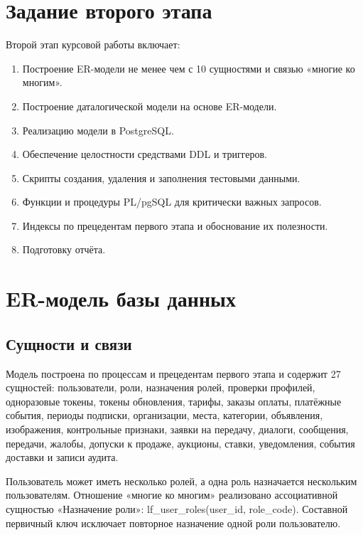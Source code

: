 \clearpage
\section*{Задание второго этапа}
{}

Второй этап курсовой работы включает:

\begin{enumerate}
\item Построение ER-модели не менее чем с 10 сущностями и связью «многие ко многим».
\item Построение даталогической модели на основе ER-модели.
\item Реализацию модели в Postgre\allowbreak{}SQL.
\item Обеспечение целостности средствами DDL и триггеров.
\item Скрипты создания, удаления и заполнения тестовыми данными.
\item Функции и процедуры PL/\allowbreak{}pg\allowbreak{}SQL для критически важных запросов.
\item Индексы по прецедентам первого этапа и обоснование их полезности.
\item Подготовку отчёта.
\end{enumerate}

\clearpage
\section{ER-модель базы данных}

\FloatBarrier
{}
\subsection{Сущности и связи}

Модель построена по процессам и прецедентам первого этапа и содержит 27 сущностей: пользователи, роли, назначения ролей, проверки профилей, одноразовые токены, токены обновления, тарифы, заказы оплаты, платёжные события, периоды подписки, организации, места, категории, объявления, изображения, контрольные признаки, заявки на передачу, диалоги, сообщения, передачи, жалобы, допуски к продаже, аукционы, ставки, уведомления, события доставки и записи аудита.

Пользователь может иметь несколько ролей, а одна роль назначается нескольким пользователям. Отношение «многие ко многим» реализовано ассоциативной сущностью «Назначение роли»: lf\_\allowbreak{}user\_\allowbreak{}roles(user\_\allowbreak{}id, role\_\allowbreak{}code). Составной первичный ключ исключает повторное назначение одной роли пользователю.

